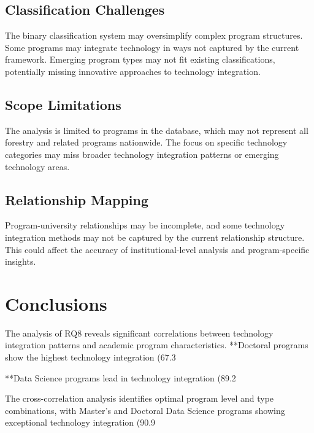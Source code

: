 \documentclass[12pt]{article}
\begin{document}
\subsection{Classification Challenges}
The binary classification system may oversimplify complex program structures. Some programs may integrate technology in ways not captured by the current framework. Emerging program types may not fit existing classifications, potentially missing innovative approaches to technology integration.

\subsection{Scope Limitations}
The analysis is limited to programs in the database, which may not represent all forestry and related programs nationwide. The focus on specific technology categories may miss broader technology integration patterns or emerging technology areas.

\subsection{Relationship Mapping}
Program-university relationships may be incomplete, and some technology integration methods may not be captured by the current relationship structure. This could affect the accuracy of institutional-level analysis and program-specific insights.

\section{Conclusions}

The analysis of RQ8 reveals significant correlations between technology integration patterns and academic program characteristics. **Doctoral programs show the highest technology integration (67.3%

**Data Science programs lead in technology integration (89.2%

The cross-correlation analysis identifies optimal program level and type combinations, with Master's and Doctoral Data Science programs showing exceptional technology integration (90.9%
\end{document}
